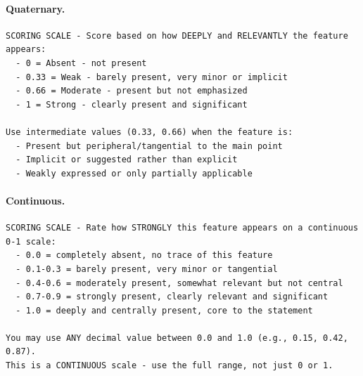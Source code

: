 \documentclass[11pt]{article}
\begin{document}
\paragraph{Quaternary.}
\begin{verbatim}
SCORING SCALE - Score based on how DEEPLY and RELEVANTLY the feature appears:
  - 0 = Absent - not present
  - 0.33 = Weak - barely present, very minor or implicit
  - 0.66 = Moderate - present but not emphasized
  - 1 = Strong - clearly present and significant

Use intermediate values (0.33, 0.66) when the feature is:
  - Present but peripheral/tangential to the main point
  - Implicit or suggested rather than explicit
  - Weakly expressed or only partially applicable
\end{verbatim}

\paragraph{Continuous.}
\begin{verbatim}
SCORING SCALE - Rate how STRONGLY this feature appears on a continuous 0-1 scale:
  - 0.0 = completely absent, no trace of this feature
  - 0.1-0.3 = barely present, very minor or tangential
  - 0.4-0.6 = moderately present, somewhat relevant but not central
  - 0.7-0.9 = strongly present, clearly relevant and significant
  - 1.0 = deeply and centrally present, core to the statement

You may use ANY decimal value between 0.0 and 1.0 (e.g., 0.15, 0.42, 0.87).
This is a CONTINUOUS scale - use the full range, not just 0 or 1.
\end{verbatim}
\end{document}
